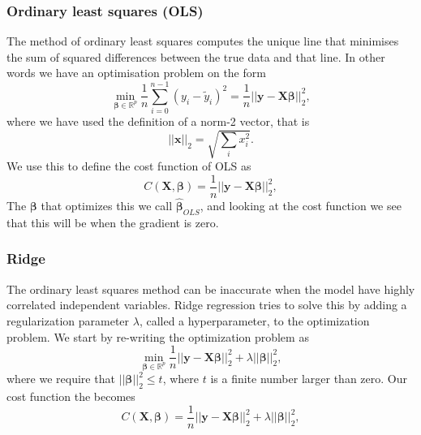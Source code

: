 \subsubsection{Ordinary least squares (OLS)}
The method of ordinary least squares computes the unique line that minimises the sum of squared differences between the true data and that line.
In other words we have an optimisation problem on the form
\begin{equation*}
	{\displaystyle \min_{\boldsymbol{\beta}
	\in{\mathbb{R}}^{p}}}\frac{1}{n}\sum_{i=0}^{n-1}\left(y_i-\tilde{y}_i\right)^2
	=\frac{1}{n}\vert\vert \boldsymbol{y}-\boldsymbol{X}\boldsymbol{\beta}\vert\vert_2^2,
\end{equation*}
where we have used the definition of a norm-2 vector, that is
\begin{equation*}
	\vert\vert \boldsymbol{x}\vert\vert_2 = \sqrt{\sum_i x_i^2}.
\end{equation*}
We use this to define the cost function of OLS as
\begin{equation}
\label{eq:cost_ols}
	C(\boldsymbol{X}, \boldsymbol\beta) 
	=\frac{1}{n}\vert\vert \boldsymbol{y}-\boldsymbol{X}\boldsymbol{\beta}\vert\vert_2^2,
\end{equation}
The $\boldsymbol\beta$ that optimizes this we call $\hat{\boldsymbol\beta}_{OLS}$, and looking at the cost function we see that this will be when the gradient is zero. 

\subsubsection{Ridge}
The ordinary least squares method can be inaccurate when the model have highly correlated independent variables. 
Ridge regression tries to solve this by adding a regularization parameter $\lambda$, called a hyperparameter, to the optimization problem. 
We start by re-writing the optimization problem as 
\begin{equation*}
	{\displaystyle \min_{\boldsymbol{\beta}\in
	{\mathbb{R}}^{p}}}\frac{1}{n}\vert\vert \boldsymbol{y}
	-\boldsymbol{X}\boldsymbol{\beta}\vert\vert_2^2+\lambda\vert\vert \boldsymbol{\beta}\vert\vert_2^2,
\end{equation*}
where we require that $\vert\vert \boldsymbol{\beta}\vert\vert_2^2\le t$, where $t$ is a finite number larger than zero. Our cost function the becomes
\begin{equation}
\label{eq:cost_ridge}
	C(\boldsymbol{X},\boldsymbol{\beta}
	)=\frac{1}{n}\vert\vert \boldsymbol{y}
	-\boldsymbol{X}\boldsymbol{\beta}\vert\vert_2^2+\lambda\vert\vert \boldsymbol{\beta}\vert\vert_2^2,
\end{equation}

